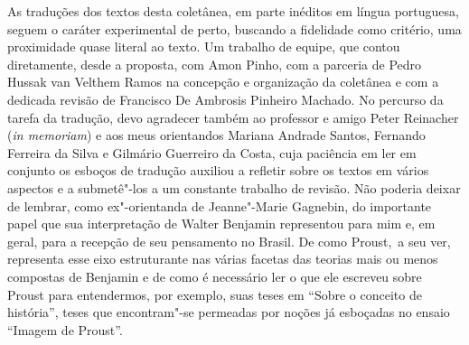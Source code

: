 As traduções dos textos desta coletânea, em parte inéditos em língua
portuguesa, seguem o caráter experimental de perto, buscando a fidelidade
como critério, uma proximidade quase literal ao texto. Um trabalho de
equipe, que contou diretamente, desde a proposta, com Amon Pinho, com a
parceria de Pedro Hussak van Velthem Ramos na concepção e organização da coletânea e com a
dedicada revisão de Francisco De Ambrosis Pinheiro Machado. No percurso
da tarefa da tradução, devo agradecer também ao professor e amigo Peter
Reinacher (\emph{in memoriam}) e aos meus orientandos Mariana Andrade Santos, Fernando
Ferreira da Silva e Gilmário Guerreiro da Costa, cuja paciência em ler
em conjunto os esboços de tradução auxiliou a refletir sobre os
textos em vários aspectos e a submetê"-los a um constante trabalho de
revisão. Não poderia deixar de lembrar, como ex"-orientanda de Jeanne"-Marie Gagnebin, do importante papel que sua interpretação de Walter Benjamin representou para mim e, em geral, para a recepção de seu pensamento no Brasil. De como Proust,~a seu ver, representa esse eixo estruturante nas várias facetas das teorias mais ou menos compostas de Benjamin e de como é necessário ler o que ele escreveu sobre Proust para entendermos, por exemplo, suas teses em ``Sobre o conceito de história'', teses que encontram"-se permeadas por noções já esboçadas no ensaio ``Imagem de Proust''. 
